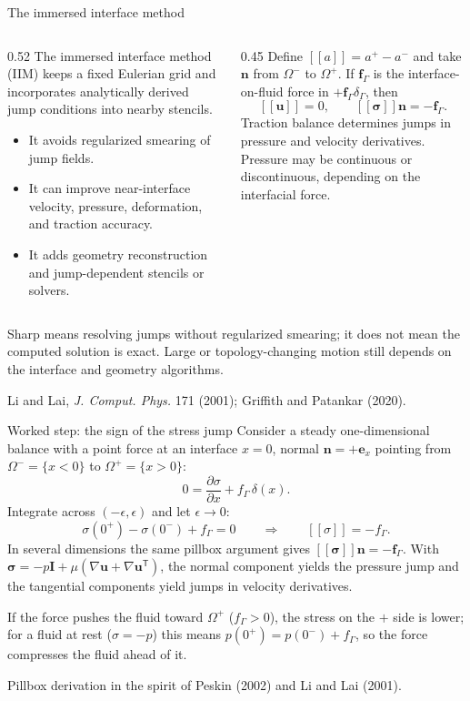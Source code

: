 \documentclass[aspectratio=169,11pt]{beamer}
\newcommand{\uvec}{\bm{u}}
\newcommand{\jump}[1]{\left[\!\left[#1\right]\!\right]}
\begin{document}
\begin{frame}{The immersed interface method}
\small
\begin{columns}[T,onlytextwidth]
\begin{column}{0.52\textwidth}
The immersed interface method (IIM) keeps a fixed Eulerian grid and incorporates analytically derived jump conditions into nearby stencils.
\begin{itemize}\itemsep4pt
      \item It avoids regularized smearing of jump fields.
  \item It can improve near-interface velocity, pressure, deformation, and traction accuracy.
  \item It adds geometry reconstruction and jump-dependent stencils or solvers.
\end{itemize}
\end{column}
\begin{column}{0.45\textwidth}
Define $\jump{a}=a^+-a^-$ and take $\bm n$ from $\Omega^-$ to $\Omega^+$. If $\bm f_\Gamma$ is the interface-on-fluid force in $+\bm f_\Gamma\delta_\Gamma$, then
\[
  \jump{\uvec}=0,
  \qquad
  \jump{\bm\sigma}\bm n=-\bm f_\Gamma.
\]
Traction balance determines jumps in pressure and velocity derivatives. Pressure may be continuous or discontinuous, depending on the interfacial force.
\end{column}
\end{columns}
\begin{punchbox}
\small Sharp means resolving jumps without regularized smearing; it does not mean the computed solution is exact. Large or topology-changing motion still depends on the interface and geometry algorithms.
\end{punchbox}
{\scriptsize Li and Lai, \emph{J. Comput. Phys.} 171 (2001); Griffith and Patankar (2020).}
\end{frame}

\begin{frame}{Worked step: the sign of the stress jump}
Consider a steady one-dimensional balance with a point force at an interface $x=0$, normal $\bm n=+\bm e_x$ pointing from $\Omega^-=\{x<0\}$ to $\Omega^+=\{x>0\}$:
\[
  0=\frac{\partial\sigma}{\partial x}+f_\Gamma\,\delta(x).
\]
Integrate across $(-\epsilon,\epsilon)$ and let $\epsilon\to0$:
\[
  \sigma(0^+)-\sigma(0^-)+f_\Gamma=0
  \qquad\Longrightarrow\qquad
  \boxed{\jump{\sigma}=-f_\Gamma}.
\]
In several dimensions the same pillbox argument gives $\jump{\bm\sigma}\bm n=-\bm f_\Gamma$. With $\bm\sigma=-p\bm I+\mu(\nabla\uvec+\nabla\uvec^{\mathsf T})$, the normal component yields the pressure jump and the tangential components yield jumps in velocity derivatives.
\begin{punchbox}
\small If the force pushes the fluid toward $\Omega^+$ ($f_\Gamma>0$), the stress on the $+$ side is lower; for a fluid at rest ($\sigma=-p$) this means $p(0^+)=p(0^-)+f_\Gamma$, so the force compresses the fluid ahead of it.
\end{punchbox}
{\scriptsize Pillbox derivation in the spirit of Peskin (2002) and Li and Lai (2001).\par}
\end{frame}
\end{document}
